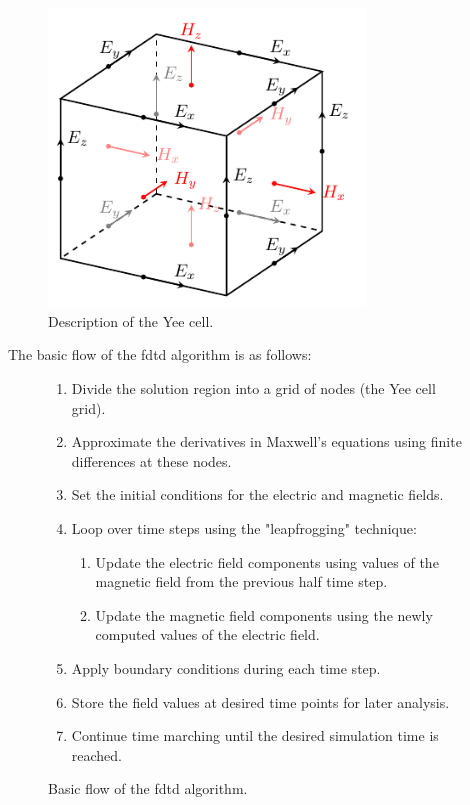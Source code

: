\begin{figure}[H]\label{fig:yee}
  \centering
  \includegraphics[width=0.75\textwidth]{figures/yee.pdf}
  \caption{Description of the Yee cell.}
\end{figure}

The basic flow of the \gls{fdtd} algorithm is as follows:
\begin{figure}[H]\label{fig:fdtd-algorithm}
  \centering
  \begin{enumerate}
  \item Divide the solution region into a grid of nodes (the Yee cell grid).
  \item Approximate the derivatives in Maxwell's equations using finite differences at these nodes.
  \item Set the initial conditions for the electric and magnetic fields.
  \item Loop over time steps using the "leapfrogging" technique:
  \begin{enumerate}
    \item Update the electric field components using values of the magnetic field from the previous half time step.
    \item Update the magnetic field components using the newly computed values of the electric field.
  \end{enumerate}
  \item Apply boundary conditions during each time step.\label{item:bc}
  \item Store the field values at desired time points for later analysis.
  \item Continue time marching until the desired simulation time is reached.
  \end{enumerate}
  \caption{Basic flow of the \gls{fdtd} algorithm.}
\end{figure}



